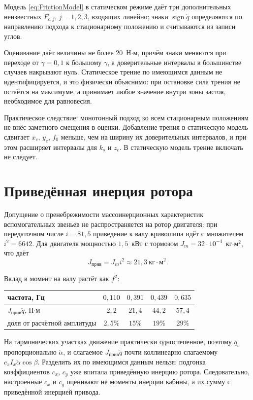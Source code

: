 Модель \ref{eq:FrictionModel} в статическом режиме даёт три дополнительных неизвестных $F_{c,j}$, $j=1,2,3$, входящих линейно; знаки $\operatorname{sign}\dot{q}$ определяются по направлению подхода к стационарному положению и считываются из записи углов.

Оценивание даёт величины не более $20$~Н$\cdot$м, причём знаки меняются при переходе от $\gamma = 0{,}1$ к большому $\gamma$, а доверительные интервалы в большинстве случаев накрывают нуль. Статическое трение по имеющимся данным не идентифицируется, и это физически объяснимо: при остановке сила трения не остаётся на максимуме, а принимает любое значение внутри зоны застоя, необходимое для равновесия.

Практическое следствие: монотонный подход ко всем стационарным положениям не внёс заметного смещения в оценки. Добавление трения в статическую модель сдвигает $x_c$, $y_c$, $f_0$ меньше, чем на ширину их доверительных интервалов, и при этом расширяет интервалы для $k_s$ и $z_c$. В статическую модель трение включать не следует.

\section{Приведённая инерция ротора}

Допущение о пренебрежимости массоинерционных характеристик вспомогательных звеньев не распространяется на ротор двигателя: при передаточном числе $i = 81{,}5$ приведение к валу кривошипа идёт с множителем $i^2 = 6642$. Для двигателя мощностью $1{,}5$~кВт с тормозом $J_m = 32\cdot10^{-4}$~кг$\cdot$м$^2$, что даёт
\begin{equation}
J_{\text{прив}} = J_m i^2 \approx 21{,}3~\text{кг}\cdot\text{м}^2 .
\end{equation}

Вклад в момент на валу растёт как $f^2$:

\begin{center}
\begin{tabular}{l|cccc}
частота, Гц & $0{,}110$ & $0{,}391$ & $0{,}439$ & $0{,}635$\\
\hline
$J_{\text{прив}}\ddot{q}$, Н$\cdot$м & $2{,}2$ & $21{,}4$ & $44{,}2$ & $57{,}4$\\
доля от расчётной амплитуды & $2{,}5\%$ & $15\%$ & $19\%$ & $29\%$\\
\end{tabular}
\end{center}

На гармонических участках движение практически одностепенное, поэтому $\ddot{q}_i$ пропорционально $\ddot{\alpha}$, и слагаемое $J_{\text{прив}}\ddot{q}$ почти коллинеарно слагаемому $c_xI_x\ddot{\alpha}\cos{\beta}$. Разделить их по имеющимся данным нельзя: подгонка коэффициентов $c_x$, $c_y$ уже впитала приведённую инерцию ротора. Следовательно, настроенные $c_x$ и $c_y$ оценивают не моменты инерции кабины, а их сумму с приведённой инерцией привода.

